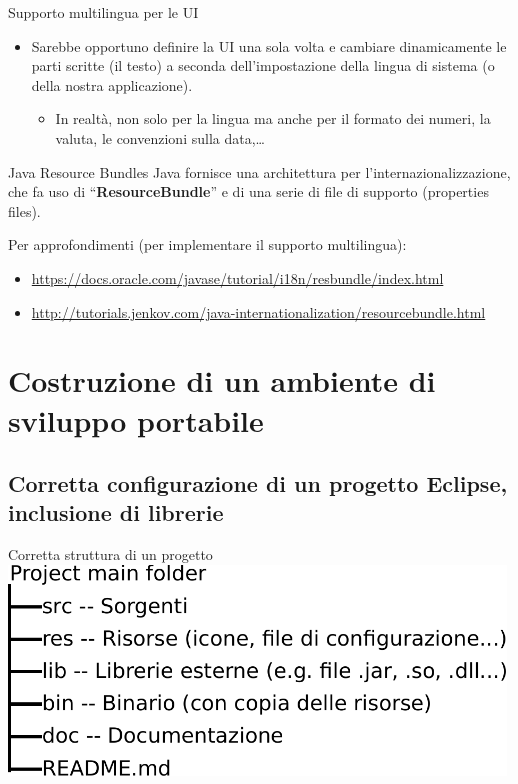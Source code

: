 \documentclass[presentation]{beamer}
\begin{document}
\begin{frame}{Supporto multilingua per le UI}
\begin{itemize}
\item Sarebbe opportuno definire la UI una sola volta e cambiare dinamicamente le parti scritte (il testo) a seconda dell'impostazione della lingua di sistema (o della nostra applicazione).
\begin{itemize}
\item In realtà, non solo per la lingua ma anche per il formato dei numeri, la valuta, le convenzioni sulla data,\dots
\end{itemize}
\end{itemize}
\begin{block}{Java Resource Bundles}
Java fornisce una architettura per l'internazionalizzazione, che fa uso di ``\textbf{ResourceBundle}'' e di una serie di file di supporto (properties files).

Per approfondimenti (per implementare il supporto multilingua):
\begin{itemize}
\item \url{https://docs.oracle.com/javase/tutorial/i18n/resbundle/index.html}
\item \url{http://tutorials.jenkov.com/java-internationalization/resourcebundle.html}
\end{itemize}
\end{block}
\end{frame}

\section{Costruzione di un ambiente di sviluppo portabile}

\subsection{Corretta configurazione di un progetto Eclipse, inclusione di librerie}

\begin{frame}{Corretta struttura di un progetto}
	\centering
	\includegraphics[width=0.99\textwidth]{img/struct}
\end{frame}
\end{document}
